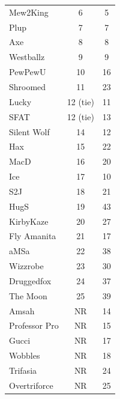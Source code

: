 \documentclass[10pt]{article}
\theoremstyle{definition}
\theoremstyle{remark}
\begin{document}
\begin{table}[!ht]
{\begin{tabular}{lcc}
    Mew2King        & 6                      & 5        \\
    Plup            & 7                      & 7        \\
    Axe             & 8                      & 8        \\
    Westballz       & 9                      & 9        \\
    PewPewU         & 10                     & 16       \\
    Shroomed        & 11                     & 23       \\
    Lucky           & 12 (tie)               & 11       \\
    SFAT            & 12 (tie)               & 13       \\
    Silent Wolf     & 14                     & 12       \\
    Hax             & 15                     & 22       \\
    MacD            & 16                     & 20       \\
    Ice             & 17                     & 10       \\
    S2J             & 18                     & 21       \\
    HugS            & 19                     & 43       \\
    KirbyKaze       & 20                     & 27       \\
    Fly Amanita     & 21                     & 17       \\
    aMSa            & 22                     & 38       \\
    Wizzrobe        & 23                     & 30       \\
    Druggedfox      & 24                     & 37       \\
    The Moon        & 25                     & 39       \\
    Amsah           & NR                     & 14       \\
    Professor Pro   & NR                     & 15       \\
    Gucci           & NR                     & 17       \\
    Wobbles         & NR                     & 18       \\
    Trifasia        & NR                     & 24       \\
    Overtriforce    & NR                     & 25       \\
\end{tabular}
}
\end{table}
\end{document}
